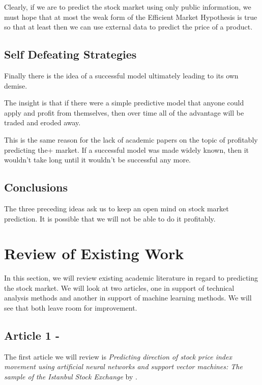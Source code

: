 \documentclass{report}
\begin{document}
Clearly, if we are to predict the stock market using only public information, we must hope that at most the weak form of the Efficient Market Hypothesis is true so that at least then we can use external data to predict the price of a product.

\section{Self Defeating Strategies}

Finally there is the idea of a successful model ultimately leading to its own demise. 

The insight is that if there were a simple predictive model that anyone could apply and profit from themselves, then over time all of the advantage will be traded and eroded away.

This is the same reason for the lack of academic papers on the topic of profitably predicting the+ market. If a successful model was made widely known, then it wouldn't take long until it wouldn't be successful any more.

\section{Conclusions}

The three preceding ideas ask us to keep an open mind on stock market prediction. It is possible that we will not be able to do it profitably.

\chapter{Review of Existing Work}

In this section, we will review existing academic literature in regard to predicting the stock market. We will look at two articles, one in support of technical analysis methods and another in support of machine learning methods. We will see that both leave room for improvement.

\section{Article 1 - \citet{kara2011predicting}} 

The first article we will review is \textit{Predicting direction of stock price index movement using artificial neural networks and support vector machines: The sample of the Istanbul Stock Exchange} by \citet{kara2011predicting}. 
\end{document}
